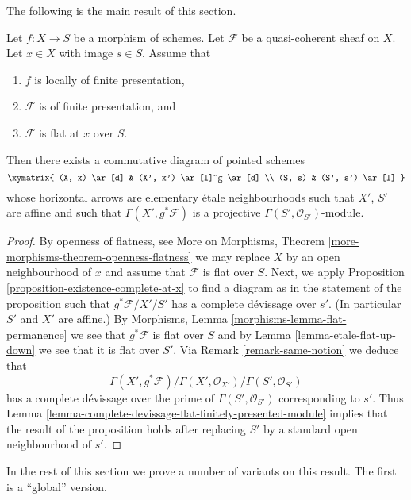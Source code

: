 \noindent
The following is the main result of this section.

\begin{proposition}
\label{proposition-finite-presentation-flat-at-point}
Let $f : X \to S$ be a morphism of schemes.
Let $\mathcal{F}$ be a quasi-coherent sheaf on $X$.
Let $x \in X$ with image $s \in S$.
Assume that
\begin{enumerate}
\item $f$ is locally of finite presentation,
\item $\mathcal{F}$ is of finite presentation, and
\item $\mathcal{F}$ is flat at $x$ over $S$.
\end{enumerate}
Then there exists a commutative diagram of pointed schemes
$$
\xymatrix{
(X, x) \ar[d] & (X', x') \ar[l]^g \ar[d] \\
(S, s) & (S', s') \ar[l]
}
$$
whose horizontal arrows are elementary \'etale neighbourhoods
such that $X'$, $S'$ are affine and such that
$\Gamma(X', g^*\mathcal{F})$ is a projective
$\Gamma(S', \mathcal{O}_{S'})$-module.
\end{proposition}

\begin{proof}
By openness of flatness, see
More on Morphisms, Theorem \ref{more-morphisms-theorem-openness-flatness}
we may replace $X$ by an open neighbourhood of $x$ and assume that
$\mathcal{F}$ is flat over $S$. Next, we apply
Proposition \ref{proposition-existence-complete-at-x}
to find a diagram as in the statement of the proposition such
that $g^*\mathcal{F}/X'/S'$ has a complete d\'evissage over $s'$.
(In particular $S'$ and $X'$ are affine.) By
Morphisms, Lemma \ref{morphisms-lemma-flat-permanence}
we see that $g^*\mathcal{F}$ is flat over $S$ and by
Lemma \ref{lemma-etale-flat-up-down}
we see that it is flat over $S'$. Via
Remark \ref{remark-same-notion}
we deduce that
$$
\Gamma(X', g^*\mathcal{F})/
\Gamma(X', \mathcal{O}_{X'})/
\Gamma(S', \mathcal{O}_{S'})
$$
has a complete d\'evissage over the prime of $\Gamma(S', \mathcal{O}_{S'})$
corresponding to $s'$. Thus
Lemma \ref{lemma-complete-devissage-flat-finitely-presented-module}
implies that the result of the proposition holds after replacing
$S'$ by a standard open neighbourhood of $s'$.
\end{proof}

\noindent
In the rest of this section we prove a number of variants
on this result. The first is a ``global'' version.


